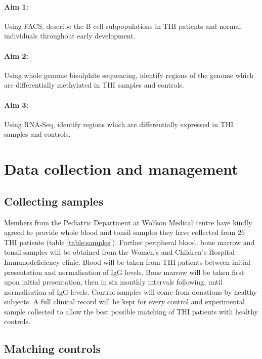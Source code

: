 \documentclass[12pt]{article}
\begin{document}
			
		
			\paragraph{Aim 1:} Using FACS, describe the B cell subpopulations in THI patients and normal individuals throughout early development.
			
			\paragraph{Aim 2:} Using whole genome bisulphite sequencing, identify regions of the genome which are differentially methylated in THI samples and controls.
			
			\paragraph{Aim 3:} Using RNA-Seq, identify regions which are differentially expressed in THI samples and controls.

	\section{Data collection and management}
	
		\subsection{Collecting samples}
			
			Members from the Pediatric Department at Wolfson Medical centre have kindly agreed to provide whole blood and tonsil samples they have collected from 26 THI patients (table \ref{table:samples}).
			Further peripheral blood, bone marrow and tonsil samples will be obtained from the Women's and Children's Hospital Immunodeficiency clinic. 
			Blood will be taken from THI patients between initial presentation and normalisation of IgG levels.
			Bone marrow will be taken first upon initial presentation, then in six monthly intervals following, until normalisation of IgG levels.
			Control samples will come from donations by healthy subjects. 
			A full clinical record will be kept for every control and experimental sample collected to allow the best possible matching of THI patients with healthy controls. 
		
		\subsection{Matching controls} 
		
\end{document}
